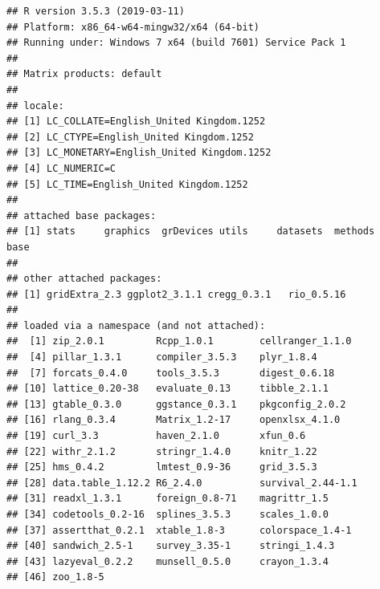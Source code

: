 \documentclass[a4paper,12pt]{article}\usepackage[]{graphicx}\usepackage[]{color}
\makeatletter
\newenvironment{kframe}{%
 \def\at@end@of@kframe{}%
 \ifinner\ifhmode%
  \def\at@end@of@kframe{\end{minipage}}%
  \begin{minipage}{\columnwidth}%
 \fi\fi%
 \def\FrameCommand##1{\hskip\@totalleftmargin \hskip-\fboxsep
 \colorbox{shadecolor}{##1}\hskip-\fboxsep
     \hskip-\linewidth \hskip-\@totalleftmargin \hskip\columnwidth}%
 \MakeFramed {\advance\hsize-\width
   \@totalleftmargin\z@ \linewidth\hsize
   \@setminipage}}%
 {\par\unskip\endMakeFramed%
 \at@end@of@kframe}
\newenvironment{knitrout}{}{} %
\makeatother
\begin{document}
\begin{knitrout}
\color{fgcolor}\begin{kframe}
\begin{verbatim}
## R version 3.5.3 (2019-03-11)
## Platform: x86_64-w64-mingw32/x64 (64-bit)
## Running under: Windows 7 x64 (build 7601) Service Pack 1
## 
## Matrix products: default
## 
## locale:
## [1] LC_COLLATE=English_United Kingdom.1252 
## [2] LC_CTYPE=English_United Kingdom.1252   
## [3] LC_MONETARY=English_United Kingdom.1252
## [4] LC_NUMERIC=C                           
## [5] LC_TIME=English_United Kingdom.1252    
## 
## attached base packages:
## [1] stats     graphics  grDevices utils     datasets  methods   base     
## 
## other attached packages:
## [1] gridExtra_2.3 ggplot2_3.1.1 cregg_0.3.1   rio_0.5.16   
## 
## loaded via a namespace (and not attached):
##  [1] zip_2.0.1         Rcpp_1.0.1        cellranger_1.1.0 
##  [4] pillar_1.3.1      compiler_3.5.3    plyr_1.8.4       
##  [7] forcats_0.4.0     tools_3.5.3       digest_0.6.18    
## [10] lattice_0.20-38   evaluate_0.13     tibble_2.1.1     
## [13] gtable_0.3.0      ggstance_0.3.1    pkgconfig_2.0.2  
## [16] rlang_0.3.4       Matrix_1.2-17     openxlsx_4.1.0   
## [19] curl_3.3          haven_2.1.0       xfun_0.6         
## [22] withr_2.1.2       stringr_1.4.0     knitr_1.22       
## [25] hms_0.4.2         lmtest_0.9-36     grid_3.5.3       
## [28] data.table_1.12.2 R6_2.4.0          survival_2.44-1.1
## [31] readxl_1.3.1      foreign_0.8-71    magrittr_1.5     
## [34] codetools_0.2-16  splines_3.5.3     scales_1.0.0     
## [37] assertthat_0.2.1  xtable_1.8-3      colorspace_1.4-1 
## [40] sandwich_2.5-1    survey_3.35-1     stringi_1.4.3    
## [43] lazyeval_0.2.2    munsell_0.5.0     crayon_1.3.4     
## [46] zoo_1.8-5
\end{verbatim}
\end{kframe}
\end{knitrout}
\end{document}
